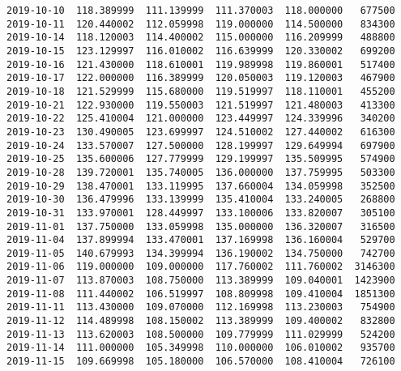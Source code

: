 \documentclass[11pt]{article}
\begin{document}
\begin{Verbatim}[commandchars=\\\{\}]
2019-10-10  118.389999  111.139999  111.370003  118.000000   677500   
2019-10-11  120.440002  112.059998  119.000000  114.500000   834300   
2019-10-14  118.120003  114.400002  115.000000  116.209999   488800   
2019-10-15  123.129997  116.010002  116.639999  120.330002   699200   
2019-10-16  121.430000  118.610001  119.989998  119.860001   517400   
2019-10-17  122.000000  116.389999  120.050003  119.120003   467900   
2019-10-18  121.529999  115.680000  119.519997  118.110001   455200   
2019-10-21  122.930000  119.550003  121.519997  121.480003   413300   
2019-10-22  125.410004  121.000000  123.449997  124.339996   340200   
2019-10-23  130.490005  123.699997  124.510002  127.440002   616300   
2019-10-24  133.570007  127.500000  128.199997  129.649994   697900   
2019-10-25  135.600006  127.779999  129.199997  135.509995   574900   
2019-10-28  139.720001  135.740005  136.000000  137.759995   503300   
2019-10-29  138.470001  133.119995  137.660004  134.059998   352500   
2019-10-30  136.479996  133.139999  135.410004  133.240005   268800   
2019-10-31  133.970001  128.449997  133.100006  133.820007   305100   
2019-11-01  137.750000  133.059998  135.000000  136.320007   316500   
2019-11-04  137.899994  133.470001  137.169998  136.160004   529700   
2019-11-05  140.679993  134.399994  136.190002  134.750000   742700   
2019-11-06  119.000000  109.000000  117.760002  111.760002  3146300   
2019-11-07  113.870003  108.750000  113.389999  109.040001  1423900   
2019-11-08  111.440002  106.519997  108.809998  109.410004  1851300   
2019-11-11  113.430000  109.070000  112.169998  113.230003   754900   
2019-11-12  114.489998  108.150002  113.389999  109.400002   832800   
2019-11-13  113.620003  108.500000  109.779999  111.029999   524200   
2019-11-14  111.000000  105.349998  110.000000  106.010002   935700   
2019-11-15  109.669998  105.180000  106.570000  108.410004   726100   


\end{Verbatim}
\end{document}
